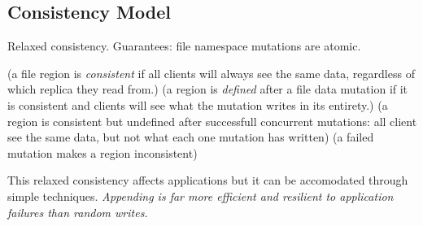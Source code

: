 \documentclass[letterpaper,twocolumn,10pt]{article}
\begin{document}
\subsection{Consistency Model}
Relaxed consistency. Guarantees: 
	file namespace mutations are atomic.

(a file region is \textit{consistent} if all clients will always see the same data, regardless of which replica they read from.)
(a region is \textit{defined} after a file data mutation if it is consistent and clients will see what the mutation writes in its entirety.)
(a region is consistent but undefined after successfull concurrent mutations: all client see the same data, but not what each one mutation has written)
(a failed mutation makes a region inconsistent)

This relaxed consistency affects applications but it can be accomodated through simple techniques. \textit{Appending is far more efficient and resilient to application failures than random writes.}



{\footnotesize 
}


\theendnotes
\end{document}

